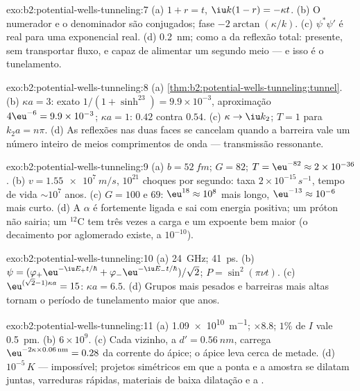 \begin{solution}{exo:b2:potential-wells-tunneling:7}
(a) $1 + r = t$, $\iu k(1 - r) = -\kappa t$. (b) O numerador e o denominador
são conjugados; fase $-2\arctan(\kappa/k)$. (c) $\psi^*\psi'$ é real para uma
exponencial real. (d) \qty{0.2}{nm}; como a  da reflexão
total: presente, sem transportar fluxo, e capaz de alimentar um segundo meio
--- e isso é o tunelamento.
\end{solution}

\begin{solution}{exo:b2:potential-wells-tunneling:8}
(a) \cref{thm:b2:potential-wells-tunneling:tunnel}. (b) $\kappa a = 3$:
exato $1/(1 + \sinh^23) = 9.9 \times 10^{-3}$, aproximação $4\eu^{-6} = 9.9 \times
10^{-3}$; $\kappa a = 1$: $0.42$ contra $0.54$. (c) $\kappa \to \iu k_2$; $T = 1$
para $k_2a = n\pi$. (d) As reflexões nas duas faces se cancelam quando a
barreira vale um número inteiro de meios comprimentos de onda --- transmissão
ressonante.
\end{solution}

\begin{solution}{exo:b2:potential-wells-tunneling:9}
(a) $b = \qty{52}{fm}$; $G = 82$; $T = \eu^{-82} \approx 2 \times 10^{-36}$. (b) $v =
\qty{1.55e7}{m/s}$, $10^{21}$ choques por segundo: taxa $2 \times 10^{-15}\,\unit{s^{-1}}$,
tempo de vida $\sim 10^7$ anos. (c) $G = 100$ e $69$: $\eu^{18} \approx 10^8$ mais longo,
$\eu^{-13} \approx 10^{-6}$ mais curto. (d) A $\alpha$ é fortemente ligada e sai
com energia positiva; um próton não sairia; um $^{12}$C tem três vezes a
carga e um expoente bem maior (o decaimento por aglomerado existe, a $10^{-10}$).
\end{solution}

\begin{solution}{exo:b2:potential-wells-tunneling:10}
(a) \qty{24}{GHz}; \qty{41}{ps}. (b) $\psi = (\varphi_+\eu^{-\iu E_+t/\hbar} +
\varphi_-\eu^{-\iu E_-t/\hbar})/\sqrt2$; $P = \sin^2(\pi\nu t)$. (c) $\eu^{(\sqrt2 - 1)
\kappa a} = 15$: $\kappa a = 6.5$. (d) Grupos mais pesados e barreiras mais altas tornam
o período de tunelamento maior que anos.
\end{solution}

\begin{solution}{exo:b2:potential-wells-tunneling:11}
(a) \qty{1.09e10}{m^{-1}}; $\times 8.8$; $1\%$ de $I$ vale \qty{0.5}{pm}. (b) $6 \times 10^9$.
(c) Cada vizinho, a $d' = \qty{0.56}{nm}$, carrega $\eu^{-2\kappa \times 0.06\,\text{nm}}
= 0.28$ da corrente do ápice; o ápice leva cerca de metade. (d)
$10^{-5}\,\unit{K}$ --- impossível; projetos simétricos em que a ponta e a amostra
se dilatam juntas, varreduras rápidas, materiais de baixa dilatação e a .
\end{solution}

